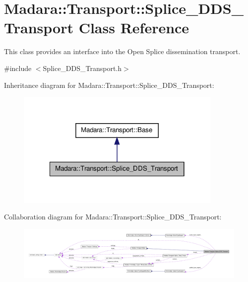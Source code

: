 \hypertarget{classMadara_1_1Transport_1_1Splice__DDS__Transport}{
\section{Madara::Transport::Splice\_\-DDS\_\-Transport Class Reference}
\label{d0/d91/classMadara_1_1Transport_1_1Splice__DDS__Transport}
}


This class provides an interface into the Open Splice dissemination transport.  




{\ttfamily \#include $<$Splice\_\-DDS\_\-Transport.h$>$}



Inheritance diagram for Madara::Transport::Splice\_\-DDS\_\-Transport:
\nopagebreak
\begin{figure}[H]
\begin{center}
\leavevmode
\includegraphics[width=282pt]{d7/da6/classMadara_1_1Transport_1_1Splice__DDS__Transport__inherit__graph}
\end{center}
\end{figure}


Collaboration diagram for Madara::Transport::Splice\_\-DDS\_\-Transport:
\nopagebreak
\begin{figure}[H]
\begin{center}
\leavevmode
\includegraphics[width=400pt]{d3/dae/classMadara_1_1Transport_1_1Splice__DDS__Transport__coll__graph}
\end{center}
\end{figure}
